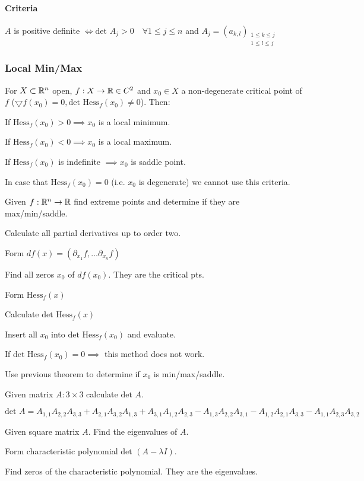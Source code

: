 \paragraph{Criteria}
$A$ is positive definite $\iff \text{det }A_j > 0 \quad \forall 1 \le j \le n$ and $A_j = (a_{k,l})_{\substack{1 \le k \le j\\ 1 \le l \le j}}$

\subsubsection{Local Min/Max}
For $X \subset \mathbb{R}^n$ open, $f: X \to \mathbb{R} \in C^2$ and $x_0 \in X$ a non-degenerate critical point of $f$ ($\bigtriangledown f(x_0) = 0, \text{det Hess}_f (x_0) \neq 0$). Then:
\begin{compactitem}
    \item If $\text{Hess}_f (x_0) > 0 \implies x_0$ is a local minimum.
    \item If $\text{Hess}_f (x_0) < 0 \implies x_0$ is a local maximum.
    \item If $\text{Hess}_f (x_0)$ is indefinite $\implies x_0$ is saddle point.
\end{compactitem}

In case that $\text{Hess}_f (x_0) = 0$ (i.e. $x_0$ is degenerate) we cannot use this criteria.

Given $f: \mathbb{R}^n \to \mathbb{R}$ find extreme points and determine if they are max/min/saddle.
\begin{compactenum}
    \item Calculate all partial derivatives up to order two.
    \item Form $df(x) = (\partial_{x_1}f, \dots \partial_{x_n}f)$
    \item Find all zeros $x_0$ of $df(x_0)$. They are the critical pts.
    \item Form $\text{Hess}_f (x)$
    \item Calculate $\text{det Hess}_f (x)$
    \item Insert all $x_0$ into $\text{det Hess}_f (x_0)$ and evaluate.
    \item If $\text{det Hess}_f (x_0) = 0 \implies$ this method does not work.
    \item Use previous theorem to determine if $x_0$ is min/max/saddle.
\end{compactenum}

Given matrix $A: 3 \times 3$ calculate $\text{det }A$.

$\text{det } A = A_{1, 1} A_{2, 2} A_{3, 3} + A_{2, 1} A_{3, 2} A_{1, 3} + A_{3, 1} A_{1, 2} A_{2, 3} - A_{1, 3} A_{2, 2} A_{3, 1} - A_{1, 2} A_{2, 1} A_{3, 3} - A_{1, 1} A_{2, 3} A_{3, 2}$

Given square matrix $A$. Find the eigenvalues of $A$.

\begin{compactenum}
    \item Form characteristic polynomial $\text{det } (A - \lambda I)$.
    \item Find zeros of the characteristic polynomial. They are the eigenvalues.
\end{compactenum}

